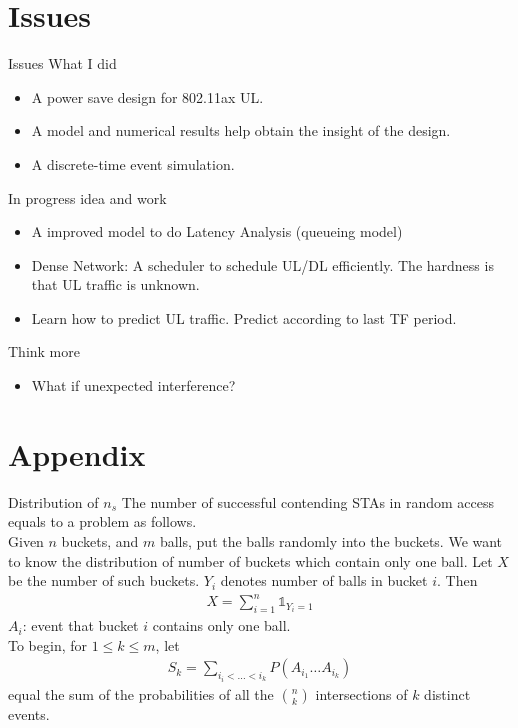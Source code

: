 \documentclass[10pt]{beamer}
\begin{document}
\section{Issues}
\begin{frame}{Issues}
	What I did
	\begin{itemize}
		\item
		A power save design for 802.11ax UL. 
		\item 
		A model and numerical results help obtain the insight of the design.
		\item 
		A discrete-time event simulation.
	\end{itemize}
    In progress idea and work
    \begin{itemize}
        \item
        A improved model to do \alert{Latency Analysis} (queueing model)
        \item \alert{Dense Network}: 
        A scheduler to schedule UL/DL efficiently. The hardness is that UL traffic is unknown.
        \item 
        Learn how to predict UL traffic. Predict according to last TF period.
    \end{itemize}
    Think more\\
    \begin{itemize}
    \item
    What if unexpected interference?    
    \end{itemize}
\end{frame}


\section{Appendix}
\begin{frame}{Distribution of $n_s$}
	The number of successful contending STAs in random access equals to a problem as follows. \\
	Given \alert{$n$} buckets, and \alert{$m$} balls, put the balls randomly into the buckets. 
	We want to know the distribution of number of buckets which contain only one ball.
	Let \alert{$X$} be the number of such buckets. \alert{$Y_i$} denotes number of balls in bucket $i$. 
	Then
	\begin{align*}
	X = \sum_{i=1}^n\mathds{1}_{Y_i = 1} 
	\end{align*}
	\alert{$A_i$}: event that bucket $i$ contains only one ball. \\
	To begin, for $1\leq k \leq m$, let
	\begin{align*}
	S_k = \sum_{i_i< \ldots < i_k}P (A_{i_1}\ldots A_{i_k})
	\end{align*}
	equal the sum of the probabilities of all the $\binom{n}{k}$ intersections of $k$ distinct events. 
\end{frame}
\end{document}

